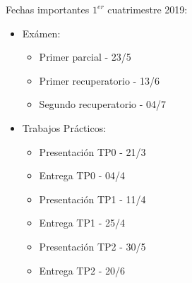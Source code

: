 \documentclass[9pt,a4paper]{article}
\begin{document}
Fechas importantes $1^{er}$ cuatrimestre 2019:

\begin{itemize}
\item Exámen:
\begin{itemize}
\item Primer parcial - 23/5
\item Primer recuperatorio - 13/6
\item Segundo recuperatorio - 04/7
\end{itemize}
\item Trabajos Prácticos:
\begin{itemize}
\item Presentación TP0 - 21/3
\item Entrega TP0 - 04/4
\item Presentación TP1 - 11/4
\item Entrega TP1 - 25/4
\item Presentación TP2 - 30/5
\item Entrega TP2 - 20/6
\end{itemize}

\end{itemize}
\end{document}
